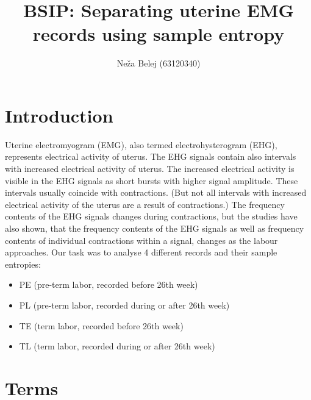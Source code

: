 \documentclass[a4paper,10pt]{article}
\title{BSIP: Separating uterine EMG records using sample entropy }
\author{Neža Belej (63120340)}
\begin{document}
\maketitle

\section {Introduction}
Uterine electromyogram (EMG), also termed electrohysterogram (EHG), represents electrical activity of uterus. The EHG signals contain also intervals with increased electrical activity of uterus. The increased electrical activity is visible in the EHG signals as short bursts with higher signal amplitude. These intervals usually coincide with contractions. (But not all intervals with increased electrical activity of the uterus are a result of contractions.) The frequency contents of the EHG signals changes during contractions, but the studies have also shown, that the frequency contents of the EHG signals as well as frequency contents of individual contractions within a signal, changes as the labour approaches.  Our task was to analyse 4 different records and their sample entropies: 

\begin{itemize}
\item{PE (pre-term labor, recorded before 26th week)}
\item{PL (pre-term labor, recorded during or after 26th week)}
\item{ TE (term labor, recorded before 26th week)}
\item{TL (term labor, recorded during or after 26th week)}
\end{itemize}

\section {Terms}
\end{document}
